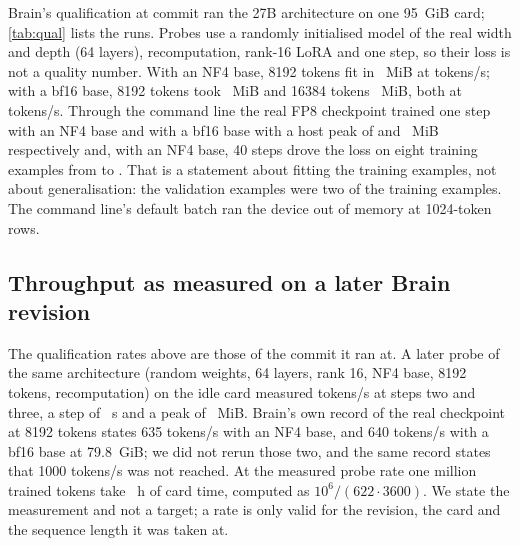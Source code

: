 Brain's qualification at commit \mEFourCommit{} ran the 27B architecture on one 95~GiB
card; \cref{tab:qual} lists the runs. Probes use a randomly initialised model of the real
width and depth (64 layers), recomputation, rank-16 LoRA and one step, so their loss is not
a quality number. With an NF4 base, 8192 tokens fit in
\mEFourProbeNfFourEightOneNineTwoPeakMib{}~MiB at
\mEFourProbeNfFourEightOneNineTwoTokensPerS{} tokens/s; with a bf16 base,
8192 tokens took \mEFourProbeBfOneSixEightOneNineTwoPeakMib{}~MiB and 16384 tokens
\mEFourProbeBfOneSixOneSixThreeEightFourPeakMib{}~MiB, both at
\mEFourProbeBfOneSixOneSixThreeEightFourTokensPerS{} tokens/s.
Through the command line the real FP8 checkpoint trained one step with an NF4 base and
with a bf16 base with a host peak of \mEFourCliNfFourOnestepHostRssMib{} and
\mEFourCliBfOneSixOnestepHostRssMib{}~MiB respectively and, with an NF4 base,
40 steps drove the loss on eight training examples from
\mEFourCliNfFourFourZerostepLossFirst{} to \mEFourCliNfFourFourZerostepLossLast{}.
That is a statement about fitting the training examples, not about generalisation: the
validation examples were two of the training examples. The command line's default
batch ran the device out of memory at 1024-token rows.

\begin{table}[tbp]
\centering
\small

\caption{Qualification runs of the 27B architecture on one card (Brain's qualification
logs, copied unmodified apart from path names; their values, digests and commands are in ).}\label{tab:qual}
\end{table}

\subsection{Throughput as measured on a later Brain revision}\label{sec:throughput}

The qualification rates above are those of the commit it ran at. A later probe of the
same architecture (random weights, 64 layers, rank 16, NF4 base, 8192 tokens, recomputation)
on the idle card measured \mThrNfFourEightOneNineTwoTokensPerS{} tokens/s at steps two and
three, a step of \mThrNfFourEightOneNineTwoStepS{}~s and a peak of
\mThrNfFourEightOneNineTwoPeakMib{}~MiB. Brain's own record of the real checkpoint
at 8192 tokens states 635 tokens/s with an NF4 base, and 640 tokens/s with a bf16 base at
79.8~GiB; we did not rerun those two, and the same record states that
1000 tokens/s was not reached. At the measured probe rate one million trained tokens
take \mThrHoursPerMillionTokens{}~h of card time, computed as $10^6/(622\cdot3600)$.
We state the measurement and not a target; a rate is only valid for the revision, the
card and the sequence length it was taken at.

